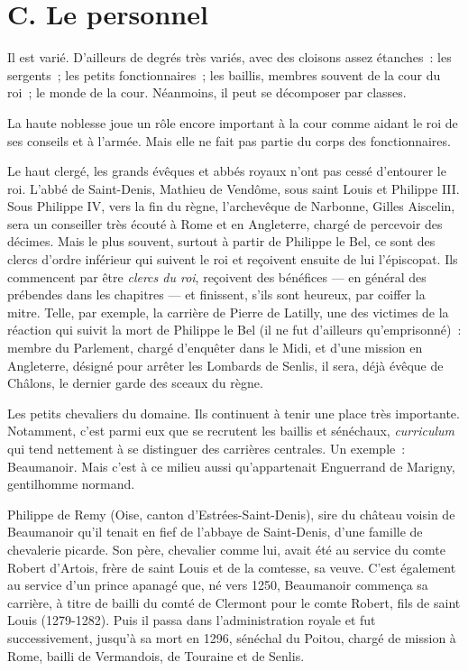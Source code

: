 \documentclass[french,twoside]{book} %
\begin{document}
\section[{C. Le personnel}]{C. Le personnel}
\label{c04c}
\noindent Il est varié. D’ailleurs de degrés très variés, avec des cloisons assez étanches : les sergents ; les petits fonctionnaires ; les baillis, membres souvent de la cour du roi ; le monde de la cour. Néanmoins, il peut se décomposer par classes.\par
La haute noblesse joue un rôle encore important à la cour comme aidant le roi de ses conseils et à l’armée. Mais elle ne fait pas partie du corps des fonctionnaires.\par
Le haut clergé, les grands évêques et abbés royaux n’ont pas cessé d’entourer le roi. L’abbé de Saint-Denis, Mathieu de Vendôme, sous saint Louis et Philippe III. Sous Philippe IV, vers la fin du règne, l’archevêque de Narbonne, Gilles Aiscelin, sera un conseiller très écouté à Rome et en Angleterre, chargé de percevoir des décimes. Mais le plus souvent, surtout à partir de Philippe le Bel, ce sont des clercs d’ordre inférieur qui suivent le roi et reçoivent ensuite de lui l’épiscopat. Ils commencent par être \emph{clercs du roi}, reçoivent des bénéfices — en général des prébendes dans les chapitres — et finissent, s’ils sont heureux, par coiffer la mitre. Telle, par exemple, la carrière de Pierre de Latilly, une des victimes de la réaction qui suivit la mort de Philippe le Bel (il ne fut d’ailleurs qu’emprisonné) : membre du Parlement, chargé d’enquêter dans le Midi, et d’une mission en Angleterre, désigné pour arrêter les Lombards de Senlis, il sera, déjà évêque de Châlons, le dernier garde des sceaux du règne.\par
Les petits chevaliers du domaine. Ils continuent à tenir une place très importante. Notamment, c’est parmi eux que se recrutent les baillis et sénéchaux, {\itshape curriculum} qui tend nettement à se distinguer des carrières centrales. Un exemple : Beaumanoir. Mais c’est à ce milieu aussi qu’appartenait Enguerrand de Marigny, gentilhomme normand.\par
\label{p41} Philippe de Remy (Oise, canton d’Estrées-Saint-Denis), sire du château voisin de Beaumanoir qu’il tenait en fief de l’abbaye de Saint-Denis, d’une famille de chevalerie picarde. Son père, chevalier comme lui, avait été au service du comte Robert d’Artois, frère de saint Louis et de la comtesse, sa veuve. C’est également au service d’un prince apanagé que, né vers 1250, Beaumanoir commença sa carrière, à titre de bailli du comté de Clermont pour le comte Robert, fils de saint Louis (1279-1282). Puis il passa dans l’administration royale et fut successivement, jusqu’à sa mort en 1296, sénéchal du Poitou, chargé de mission à Rome, bailli de Vermandois, de Touraine et de Senlis.\par
\end{document}
